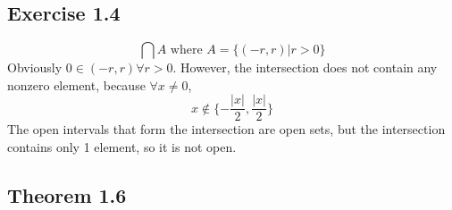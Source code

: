\subsection{Exercise 1.4}


\begin{solution}
 $$\bigcap A \text{ where } A = \{(-r,r)|r>0\}$$
 Obviously $0 \in (-r,r) \forall r > 0$. However, the intersection does not contain any nonzero element, because $\forall x \neq 0$,
 $$x \notin \{-\frac{|x|}{2},\frac{|x|}{2}\}$$
 The open intervals that form the intersection are open sets, but the intersection contains only 1 element, so it is not open.
\end{solution}

\subsection{Theorem 1.6}

\question

